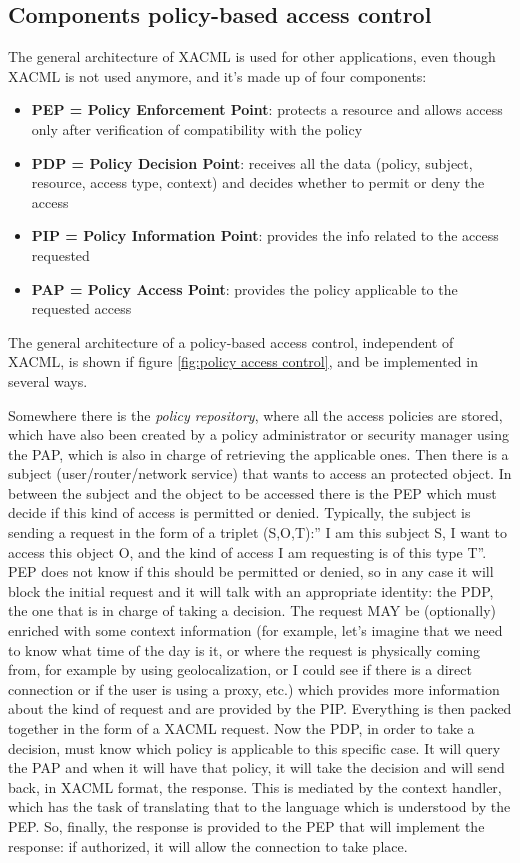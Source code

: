 \subsection{Components policy-based access control}
The general architecture of XACML is used for other applications, even
though XACML is not used anymore, and it's made up of four components:
\begin{itemize}
  \item  \textbf{PEP = Policy Enforcement Point}: protects a resource
    and allows access only after verification of compatibility with
    the policy
  \item  \textbf{PDP = Policy Decision Point}: receives all the data
    (policy, subject, resource, access type, context) and decides
    whether to permit or deny the access
  \item \textbf{PIP = Policy Information Point}: provides the info
    related to the access requested
  \item \textbf{PAP = Policy Access Point}: provides the policy
    applicable to the requested access
\end{itemize}

 The general architecture of a policy-based access control,
 independent of XACML, is shown if figure \ref{fig:policy access
 control}, and be implemented in several ways.

 Somewhere there is the \textit{policy repository}, where all the
 access policies are stored, which have also been created by a policy
 administrator or security manager using the PAP, which is also in
 charge of retrieving the applicable ones. Then there is a subject
 (user/router/network service) that wants to access an protected
 object. In between the subject and the object to be accessed there is
 the PEP which must decide if this kind of access is permitted or
 denied. Typically, the subject is sending a request in the form of a
 triplet
 (S,O,T):” I am this subject S, I want to access this object O, and
 the kind of access I am requesting is of this type T”. PEP does not
 know if this should be permitted or denied, so in any case it will
 block the initial request and it will talk with an appropriate
 identity: the PDP, the one that is in charge of taking a decision.
 The request MAY be (optionally) enriched with some context
 information (for example, let’s imagine that we need to know what
 time of the day is it, or where the request is physically coming
 from, for example by using geolocalization, or I could see if there
 is a direct connection or if the user is using a proxy, etc.) which
 provides more information about the kind of request and are provided
 by the PIP. Everything is
 then packed together in the form of a XACML request. Now the PDP, in
 order to take a decision, must know which policy is applicable to
 this specific case. It will query the PAP and when it will have that
 policy, it will take the decision and will send back, in XACML
 format, the response. This is mediated by the context handler, which
 has the task of translating that to the language which is understood
 by the PEP. So, finally, the response is provided to the PEP that
 will implement the response: if authorized, it will allow the 
 connection to take place.

